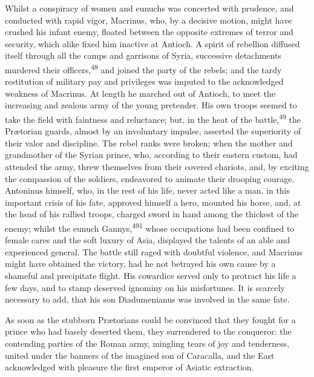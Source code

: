 Whilst a conspiracy of women and eunuchs was concerted with
prudence, and conducted with rapid vigor, Macrinus, who, by a
decisive motion, might have crushed his infant enemy, floated
between the opposite extremes of terror and security, which alike
fixed him inactive at Antioch. A spirit of rebellion diffused
itself through all the camps and garrisons of Syria, successive
detachments murdered their officers,\textsuperscript{48} and joined the party of
the rebels; and the tardy restitution of military pay and
privileges was imputed to the acknowledged weakness of Macrinus.
At length he marched out of Antioch, to meet the increasing and
zealous army of the young pretender. His own troops seemed to
take the field with faintness and reluctance; but, in the heat of
the battle,\textsuperscript{49} the Prætorian guards, almost by an involuntary
impulse, asserted the superiority of their valor and discipline.
The rebel ranks were broken; when the mother and grandmother of
the Syrian prince, who, according to their eastern custom, had
attended the army, threw themselves from their covered chariots,
and, by exciting the compassion of the soldiers, endeavored to
animate their drooping courage. Antoninus himself, who, in the
rest of his life, never acted like a man, in this important
crisis of his fate, approved himself a hero, mounted his horse,
and, at the head of his rallied troops, charged sword in hand
among the thickest of the enemy; whilst the eunuch Gannys,\textsuperscript{491}
whose occupations had been confined to female cares and the soft
luxury of Asia, displayed the talents of an able and experienced
general. The battle still raged with doubtful violence, and
Macrinus might have obtained the victory, had he not betrayed his
own cause by a shameful and precipitate flight. His cowardice
served only to protract his life a few days, and to stamp
deserved ignominy on his misfortunes. It is scarcely necessary to
add, that his son Diadumenianus was involved in the same fate.

As soon as the stubborn Prætorians could be convinced that they
fought for a prince who had basely deserted them, they
surrendered to the conqueror: the contending parties of the Roman
army, mingling tears of joy and tenderness, united under the
banners of the imagined son of Caracalla, and the East
acknowledged with pleasure the first emperor of Asiatic
extraction.



